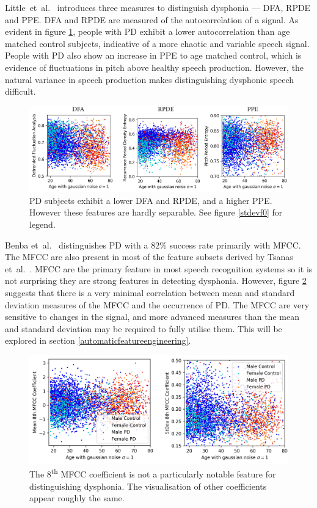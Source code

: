 \documentclass[12pt, twoside]{book}
\begin{document}
Little~et~al.~\cite{splittlenonlinear2007,splittledysphonia2009} introduces three measures to distinguish dysphonia --- DFA, RPDE and PPE. DFA and RPDE are measured of the autocorrelation of a signal. As evident in figure \ref{dfapperpde}, people with PD exhibit a lower autocorrelation than age matched control subjects, indicative of a more chaotic and variable speech signal. People with PD also show an increase in PPE to age matched control, which is evidence of fluctuations in pitch above healthy speech production. However, the natural variance in speech production makes distinguishing dysphonic speech difficult.


\begin{figure}[h]
	\caption{PD subjects exhibit a lower DFA and RPDE, and a higher PPE. However these features are hardly separable. See figure \ref{stdevf0} for legend.}
	\label{dfapperpde}
	\centering\centerline{\includegraphics[width=1.1\linewidth]{dfapperpde.png}}
\end{figure}


Benba et~al.~\cite{benba2014mfcc} distinguishes PD with a 82\% success rate primarily with MFCC. The MFCC are also present in most of the feature subsets derived by Tsanas et~al.~\cite{tsanas2012novel}. MFCC are the primary feature in most speech recognition systems so it is not surprising they are strong features in detecting dysphonia. However, figure \ref{mfcc_feat} suggests that there is a very minimal correlation between mean and standard deviation measures of the MFCC and the occurrence of PD. The MFCC are very sensitive to changes in the signal, and more advanced measures than the mean and standard deviation may be required to fully utilise them. This will be explored in section \ref{automaticfeatureengineering}.


\begin{figure}[h]
	\caption{The 8\textsuperscript{th} MFCC coefficient is not a particularly notable feature for distinguishing dysphonia. The visualisation of other coefficients appear roughly the same. }
	\label{mfcc_feat}
	\centering\includegraphics[width=1\linewidth]{mfcc_feat.png}
\end{figure}
\end{document}
